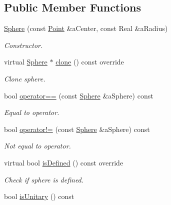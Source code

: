 \subsection*{Public Member Functions}
\begin{DoxyCompactItemize}
\item 
\hyperlink{classlibrary_1_1math_1_1geom_1_1d3_1_1objects_1_1_sphere_a55dccc8ea16ee55cd7694c26afa8ea39}{Sphere} (const \hyperlink{classlibrary_1_1math_1_1geom_1_1d3_1_1objects_1_1_point}{Point} \&a\+Center, const Real \&a\+Radius)
\begin{DoxyCompactList}\small\item\em Constructor. \end{DoxyCompactList}\item 
virtual \hyperlink{classlibrary_1_1math_1_1geom_1_1d3_1_1objects_1_1_sphere}{Sphere} $\ast$ \hyperlink{classlibrary_1_1math_1_1geom_1_1d3_1_1objects_1_1_sphere_a58370a8ff15b7c5a48cf4ffec5be3015}{clone} () const override
\begin{DoxyCompactList}\small\item\em Clone sphere. \end{DoxyCompactList}\item 
bool \hyperlink{classlibrary_1_1math_1_1geom_1_1d3_1_1objects_1_1_sphere_ace12dcb88802f002f5797077130c4b98}{operator==} (const \hyperlink{classlibrary_1_1math_1_1geom_1_1d3_1_1objects_1_1_sphere}{Sphere} \&a\+Sphere) const
\begin{DoxyCompactList}\small\item\em Equal to operator. \end{DoxyCompactList}\item 
bool \hyperlink{classlibrary_1_1math_1_1geom_1_1d3_1_1objects_1_1_sphere_a127131c48a3bfe342508630cfd399fae}{operator!=} (const \hyperlink{classlibrary_1_1math_1_1geom_1_1d3_1_1objects_1_1_sphere}{Sphere} \&a\+Sphere) const
\begin{DoxyCompactList}\small\item\em Not equal to operator. \end{DoxyCompactList}\item 
virtual bool \hyperlink{classlibrary_1_1math_1_1geom_1_1d3_1_1objects_1_1_sphere_a0598bd75f8a34e07a3ad36cf10a7f098}{is\+Defined} () const override
\begin{DoxyCompactList}\small\item\em Check if sphere is defined. \end{DoxyCompactList}\item 
bool \hyperlink{classlibrary_1_1math_1_1geom_1_1d3_1_1objects_1_1_sphere_a5ec4120b51da519ec14e8bded930b742}{is\+Unitary} () const

\end{DoxyCompactItemize}
